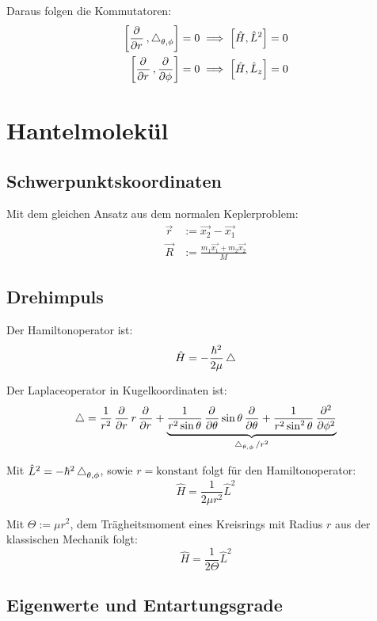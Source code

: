 Daraus folgen die Kommutatoren:
\begin{align*}
	\sbr{\dpd{}r, \laplace_{\theta,\phi}} = 0
	&\implies
	\sbr{\hat H, \hat L^2} = 0 \\
	\sbr{\dpd{}r, \dpd{}\phi} = 0
	&\implies
	\sbr{\hat H, \hat L_z} = 0
\end{align*}


\section{Hantelmolekül}

\subsection{Schwerpunktskoordinaten}

Mit dem gleichen Ansatz aus dem normalen Keplerproblem:
\begin{align*}
	\vec r &:= \vec{x_2} - \vec{x_1} \\
	\vec R &:= \frac{m_1 \vec{x_1} + m_2 \vec{x_2}}M
\end{align*}

\fehlt

\subsection{Drehimpuls}

Der Hamiltonoperator ist:
\[
	\hat H = - \frac{\hbar^2}{2\mu} \operatorname{\bigtriangleup}
\]

\newcommand\legendrian{\laplace_{\theta,\phi}}

Der Laplaceoperator in Kugelkoordinaten ist:
\[
	\laplace = \frac1{r^2} \dpd{}r r \dpd{}r + \underbrace{\frac1{r^2\sin\theta} \dpd{}\theta \sin\theta \dpd{}\theta + \frac1{r^2\sin^2\theta} \dpd[2]{}\phi}_{\legendrian/r^2}
\]

Mit $\hat L^2 = - \hbar^2 \legendrian$, sowie $r = \text{konstant}$ folgt für
den Hamiltonoperator:
\[
	\hat H = \frac{1}{2\mu r^2} \hat L^2
\]

Mit $\Theta := \mu r^2$, dem Trägheitsmoment eines Kreisrings mit Radius $r$
aus der klassischen Mechanik folgt:
\[
	\hat H = \frac{1}{2\Theta} \hat L^2
\]

\subsection{Eigenwerte und Entartungsgrade}

